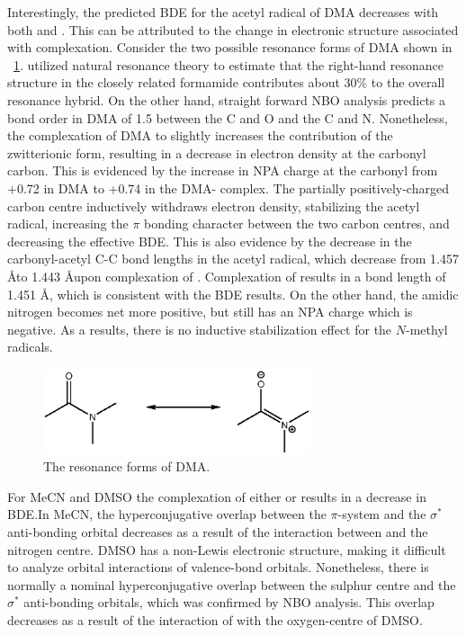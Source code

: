 Interestingly, the predicted BDE for the acetyl radical of DMA decreases with
both  and . This can be attributed to the change in electronic
structure associated with complexation. Consider the two possible resonance
forms of DMA shown in ~\ref{fig:dma-res}. \cite{Hrabal1997} utilized natural
resonance theory to estimate that the right-hand resonance structure in the
closely related formamide contributes about 30\% to the overall resonance
hybrid. On the other hand, straight forward NBO analysis predicts a bond order
in DMA of 1.5 between the C and O and the C and N. Nonetheless, the complexation
of DMA to  slightly increases the contribution of the zwitterionic
form, resulting in a decrease in electron density at the carbonyl carbon. This
is evidenced by the increase in NPA charge at the carbonyl from +0.72 in DMA to
+0.74 in the DMA- complex.  The partially positively-charged carbon
centre inductively withdraws electron density, stabilizing the acetyl radical,
increasing the $\pi$ bonding character between the two carbon centres, and
decreasing the effective BDE. This is also evidence by the decrease in the
carbonyl-acetyl C-C bond lengths in the acetyl radical, which decrease from
1.457 \AA to 1.443 \AA upon complexation of . Complexation of
 results in a bond length of 1.451 \AA, which is consistent with the
BDE results.  On the other hand, the amidic nitrogen becomes net more positive,
but still has an NPA charge which is negative. As a results, there is no
inductive stabilization effect for the $N$-methyl radicals.

\begin{figure}[!htpb]
  \centering
  \includegraphics[width=0.7\textwidth]{figures/DMA-resonance.eps}
  \caption{The resonance forms of DMA.}
  \label{fig:dma-res}
\end{figure}

For MeCN and DMSO the complexation of either  or  results in a
decrease in  BDE.\@ In MeCN, the hyperconjugative overlap between the
 $\pi$-system and the  $\sigma^*$ anti-bonding orbital decreases
as a result of the interaction between  and the nitrogen centre. DMSO
has a non-Lewis electronic structure, making it difficult to analyze orbital
interactions of valence-bond orbitals. Nonetheless, there is normally a nominal
hyperconjugative overlap between the sulphur centre and the  $\sigma^*$
anti-bonding orbitals, which was confirmed by NBO analysis. This overlap
decreases as a result of the interaction of  with the oxygen-centre of
DMSO.

